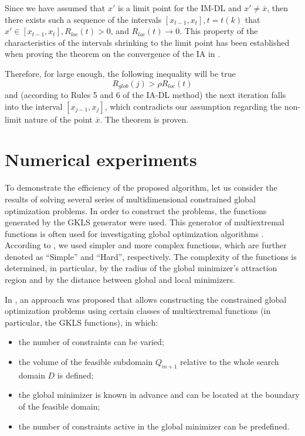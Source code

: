 \documentclass[twocolumn]{svjour3}          %
\begin{document}
	Since we have assumed that $x'$ is a limit point for the IM-DL and  $x' \neq \bar x$, then there exists such a sequence of the intervals $[x_{t-1}, x_t], t=t(k)$ that $x' \in [x_{t-1}, x_t], R_{loc}(t)>0$, and $R_{loc}(t) \rightarrow 0$. This property of the characteristics of the intervals shrinking to the limit point has been established when proving the theorem on the convergence of the IA in \cite{Sergeyev2013}.

	Therefore, for large enough, the following inequality will be true
\begin{equation}
	R_{glob}(j) > \rho R_{loc}(t)
\end{equation}
and (according to Rules 5 and 6 of the IA-DL method) the next iteration falls into the interval $[x_{j-1}, x_j]$, which contradicts our assumption regarding the non-limit nature of the point $\bar x$. The theorem is proven.



\section{Numerical experiments}
\label{sec:5}
To demonstrate the efficiency of the proposed algorithm, let us consider the results of solving several series of multidimensional constrained global optimization problems. In order to construct the problems, the functions generated by the GKLS generator \cite{Gaviano2003} were used. This generator of multiextremal functions is often used for investigating global optimization algorithms \cite{Paulavicius2014,Sergeyev2015,Barkalov2018}. According to \cite{Gaviano2003}, we used simpler and more complex functions, which are  further denoted as ``Simple'' and ``Hard'', respectively. The complexity of the functions is determined, in particular, by the radius of the global minimizer's attraction region and by the distance between global and local minimizers.
	
	In \cite{Gergel2017_2,Gergel2019}, an approach was proposed that allows constructing the constrained global optimization problems using certain classes of multiextremal functions (in particular, the GKLS functions), in which:
\begin{itemize}
  \item the number of constraints can be varied;
  \item the volume of the feasible subdomain $Q_{m+1}$ relative to the whole search domain $D$ is defined;
	\item the global minimizer is known in advance and can be located at the boundary of the feasible domain;
	\item the number of constraints active in the global minimizer can be predefined.
\end{itemize}	
\end{document}
